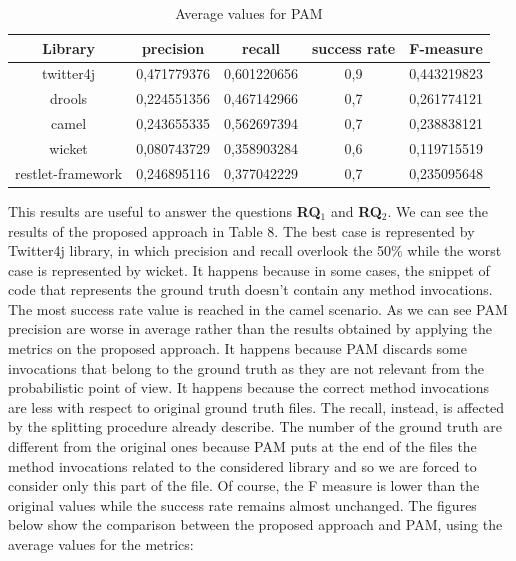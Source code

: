  
 \begin{table}[H]
  \caption{ Average values for PAM}
  \label{Table:4}
 \begin{center}
\begin{tabular}{|c|c|c|c|c|}
\hline
 \textbf{Library} & \textbf{precision}  & \textbf{recall} & \textbf{success rate} & \textbf{F-measure} \\ 
\hline
 twitter4j & 0,471779376  & 0,601220656 & 0,9  & 0,443219823  \\
\hline
drools & 0,224551356 & 0,467142966   & 0,7 & 0,261774121 \\
\hline
camel & 0,243655335  & 0,562697394 & 0,7 & 0,238838121 \\
\hline 
wicket &0,080743729  & 0,358903284 &  0,6 & 0,119715519  \\
\hline
restlet-framework & 0,246895116  & 0,377042229 & 0,7 & 0,235095648 \\
\hline
\end{tabular}
\end{center}
\end{table} 
This results are useful to answer the questions \textbf{RQ$_1$} and \textbf{RQ$_2$}. We can see the results of the proposed approach in Table 8. The best case is represented by Twitter4j library, in which precision and recall overlook the 50\% while the worst case is represented by wicket. It happens because in some cases, the snippet of code that represents the ground truth doesn't contain any method invocations. The most success rate value is reached in the camel scenario.
As we can see PAM precision are worse in average rather than the results obtained by applying the metrics on the proposed approach. It happens because PAM discards some invocations that belong to the ground truth as they are not relevant from the probabilistic point of view. It happens because the correct method invocations are less with respect to original ground truth files. The recall, instead, is affected by the splitting procedure already describe. The number of the ground truth are different from the original ones because PAM puts at the end of the files the method invocations related to the considered library and so we are forced to consider only this part of the file. Of course, the F measure is lower than the original values while the success rate remains almost unchanged. The figures below show the comparison between the proposed approach and PAM, using the average values for the metrics:\\

